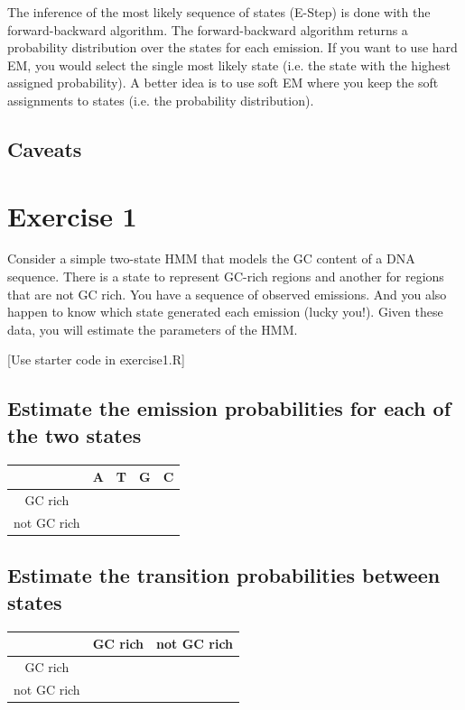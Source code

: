 \documentclass[11pt, oneside]{article}
\begin{document}
The inference of the most likely sequence of states (E-Step) is done with the forward-backward algorithm. The forward-backward algorithm returns a probability distribution over the states for each emission. If you want to use hard EM, you would select the single most likely state (i.e. the state with the highest assigned probability). A better idea is to use soft EM where you keep the soft assignments to states (i.e. the probability distribution).

\subsection{Caveats}

\section{Exercise 1}
Consider a simple two-state HMM that models the GC content of a DNA sequence. 
There is a state to represent GC-rich regions and another for regions that are not GC rich.
You have a sequence of observed emissions. 
And you also happen to know which state generated each emission (lucky you!). 
Given these data, you will estimate the parameters of the HMM. 

[Use starter code in exercise1.R]

\subsection{Estimate the emission probabilities for each of the two states}
\begin{table}[H]
\centering
\begin{tabular}{|c|c|c|c|c|}
\hline
& A & T & G & C \\\hline
GC rich & & & &  \\\hline
not GC rich & & & & \\\hline
\end{tabular}
\end{table}

\subsection{Estimate the transition probabilities between states}
\begin{table}[H]
\centering
\begin{tabular}{|c|c|c|}
\hline
& GC rich & not GC rich \\\hline
GC rich & &  \\\hline
not GC rich & &  \\\hline
\end{tabular}
\end{table}
\end{document}
